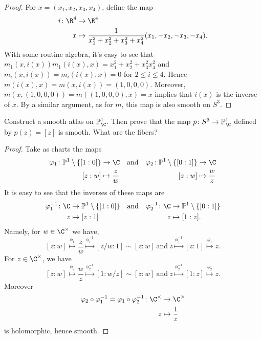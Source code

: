 \documentclass[10pt]{amsart}
\begin{document}
\begin{thm}
\begin{proof}
    For $x = (x_1, x_2, x_3, x_4)$, define the map
    \begin{align*}
      i \colon \R^4 &\rightarrow \R^4\\
      x &\mapsto \frac{1}{x_1^2 + x_2^2 + x_3^2 + x_4^2} (x_1, -x_2, -x_3, -x_4).
    \end{align*}
    With some routine algebra, it's easy to see that $m_1(x,i(x)) m_1(i(x), x) = x_1^2 + x_2^2 + x_3^2 x_4^2$ and $m_i(x,i(x)) = m_i(i(x), x) = 0$ for $2 \leq i \leq 4$.
    Hence $m(i(x), x) = m(x, i(x)) = (1,0,0,0)$.
    Moreover, $m(x, (1,0,0,0)) = m((1,0,0,0), x) = x$ implies that $i(x)$ is the inverse of $x$.
    By a similar argument, as for $m$, this map is also smooth on $S^3$.
  \end{proof}
\end{thm}

\begin{thm}
  Construct a smooth atlas on $\mathbb{P}^1_\C$.
  Then prove that the map $p \colon S^3 \rightarrow \mathbb{P}^1_\C$ defined by $p(z) = [z]$ is smooth.
  What are the fibers?

  \begin{proof}
    Take as charts the maps
    \begin{align*}
      \varphi_1 \colon \mathbb{P}^1 \setminus \left\{[1 : 0]\right\} &\rightarrow \C & \text{and} & & \varphi_2 \colon \mathbb{P}^1 \setminus \left\{[0 : 1]\right\} & \rightarrow \C\\
             [z : w] & \mapsto \frac{z}{w} & & & [z : w] & \mapsto \frac{w}{z}
    \end{align*}
    It is easy to see that the inverses of these maps are
    \begin{align*}
      \varphi_1^{-1} \colon \C &\rightarrow \mathbb{P}^1 \setminus \left\{[1 : 0]\right\} & \text{and} & & \varphi_2^{-1} \colon \C & \rightarrow \mathbb{P}^1 \setminus \left\{[0 : 1]\right\}\\
      z & \mapsto \left[z : 1 \right] & & & z & \mapsto [1 : z].
    \end{align*}
    Namely, for $w \in \C^\times$ we have, 
    $$[z : w] \overset{\phi_1}{\mapsto} \frac{z}{w} \overset{\phi_1^{-1}}{\mapsto} [z/w : 1] \sim [z : w]\ 
    \text{and}\ z \overset{\phi_1^{-1}}{\mapsto} [z : 1] \overset{\phi_1}{\mapsto} z.$$
    For $z \in \C^\times$, we have
    $$[z : w] \overset{\phi_2}{\mapsto} \frac{w}{z} \overset{\phi_2^{-1}}{\mapsto} [1 : w/z] \sim [z : w]\ 
    \text{and}\ z \overset{\phi_2^{-1}}{\mapsto} [1 : z] \overset{\phi_2}{\mapsto} z.$$
    Moreover
    \begin{align*}
      \varphi_2 \circ \varphi_1^{-1}  = \varphi_1 \circ \varphi_2^{-1} \colon \C^\times &\rightarrow \C^\times\\
      z &\mapsto \frac{1}{z}
    \end{align*}
    is holomorphic, hence smooth.


\end{proof}
\end{thm}
\end{document}
